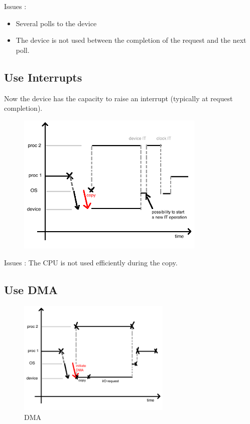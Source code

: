 \documentclass[a4paper,10pt]{article}
\begin{document}
Issues :

\begin{itemize}
  \item Several polls to the device
  \item The device is not used between the completion of the request and the next poll.
\end{itemize}

\subsection{Use Interrupts}

Now the device has the capacity to raise an interrupt (typically at request completion).

\begin{figure}[h!]
  \begin{center}
    \includegraphics[width=0.8\textwidth]{interrupt.png}
    \label{fig:4}
  \end{center}
\end{figure}

Issues : The CPU is not used efficiently during the copy.

\subsection{Use DMA}

\begin{figure}[h!]
  \begin{center}
    \includegraphics[width=0.65\textwidth]{dma.png}
    \caption{DMA}
    \label{fig:5}
  \end{center}
\end{figure}
\end{document}
